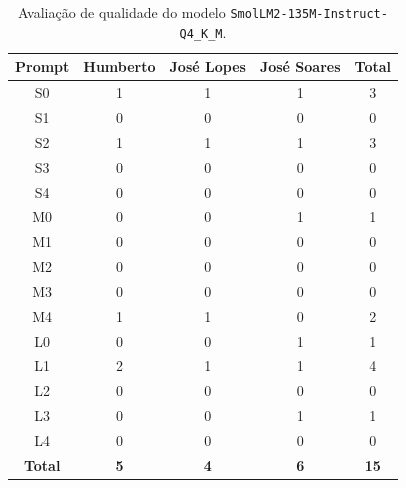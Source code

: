 \begin{table}[H]
    \centering
    \begin{tabular}{|c|c|c|c|c|}
        \hline
        \textbf{Prompt}      &
        \textbf{Humberto}    &
        \textbf{José Lopes}  &
        \textbf{José Soares} &
        \textbf{Total}       \\ \hline

        S0 & 1 & 1 & 1 & 3 \\ \hline
        S1 & 0 & 0 & 0 & 0 \\ \hline
        S2 & 1 & 1 & 1 & 3 \\ \hline
        S3 & 0 & 0 & 0 & 0 \\ \hline
        S4 & 0 & 0 & 0 & 0 \\ \hline
        M0 & 0 & 0 & 1 & 1 \\ \hline
        M1 & 0 & 0 & 0 & 0 \\ \hline
        M2 & 0 & 0 & 0 & 0 \\ \hline
        M3 & 0 & 0 & 0 & 0 \\ \hline
        M4 & 1 & 1 & 0 & 2 \\ \hline
        L0 & 0 & 0 & 1 & 1 \\ \hline
        L1 & 2 & 1 & 1 & 4 \\ \hline
        L2 & 0 & 0 & 0 & 0 \\ \hline
        L3 & 0 & 0 & 1 & 1 \\ \hline
        L4 & 0 & 0 & 0 & 0 \\ \hline

        \textbf{Total} & \textbf{5} & \textbf{4} & \textbf{6} & \textbf{15} \\ \hline
    \end{tabular}
    \caption{Avaliação de qualidade do modelo \texttt{SmolLM2-135M-Instruct-Q4\_K\_M}.}
\end{table}

